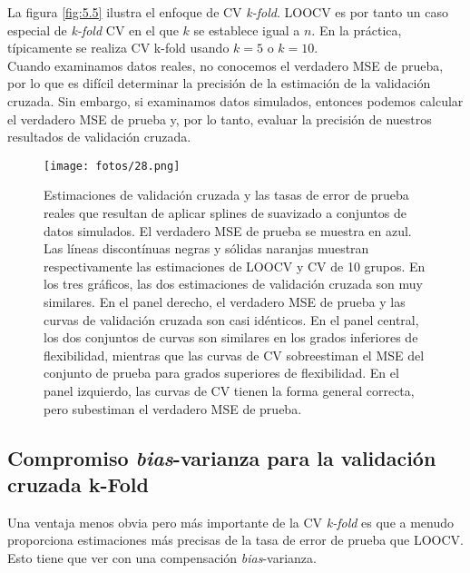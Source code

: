 La figura \ref{fig:5.5} ilustra el enfoque de CV \textit{k-fold}. LOOCV es por tanto un caso especial de \textit{k-fold} CV en el que $k$ se establece igual a $n$. En la práctica, típicamente se realiza CV k-fold usando $k = 5$ o $k = 10$. \\

Cuando examinamos datos reales, no conocemos el verdadero MSE de prueba, por lo que es difícil determinar la precisión de la estimación de la validación cruzada. Sin embargo, si examinamos datos simulados, entonces podemos calcular el verdadero MSE de prueba y, por lo tanto, evaluar la precisión de nuestros resultados de validación cruzada. 

\begin{figure}[h]
\centering
\texttt{[image: fotos/28.png]}
\caption{Estimaciones de validación cruzada y las tasas de error de prueba reales que resultan de aplicar splines de suavizado a conjuntos de datos simulados. El verdadero MSE de prueba se muestra en azul. Las líneas discontínuas negras y sólidas naranjas muestran respectivamente las estimaciones de LOOCV y CV de 10 grupos. En los tres gráficos, las dos estimaciones de validación cruzada son muy similares. En el panel derecho, el verdadero MSE de prueba y las curvas de validación cruzada son casi idénticos. En el panel central, los dos conjuntos de curvas son similares en los grados inferiores de flexibilidad, mientras que las curvas de CV sobreestiman el MSE del conjunto de prueba para grados superiores de flexibilidad. En el panel izquierdo, las curvas de CV tienen la forma general correcta, pero subestiman el verdadero MSE de prueba.}
\label{fig5.6}
\end{figure}

\subsection{Compromiso \textit{bias}-varianza para la validación cruzada k-Fold}

Una ventaja menos obvia pero más importante de la CV \textit{k-fold} es que a menudo proporciona estimaciones más precisas de la tasa de error de prueba que LOOCV. Esto tiene que ver con una compensación \textit{bias}-varianza. \\

